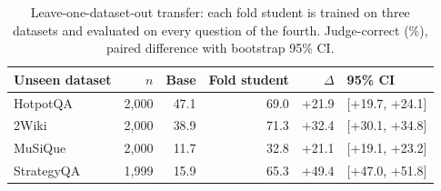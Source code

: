 \begin{table}[t]
\centering
\small
\caption{Leave-one-dataset-out transfer: each fold student is trained on three datasets and evaluated on every question of the fourth. Judge-correct (\%), paired difference with bootstrap 95\% CI.}
\label{tab:E13-lodo}
\begin{tabular}{lrrrrl}
\toprule
Unseen dataset & $n$ & Base & Fold student & $\Delta$ & 95\% CI \\
\midrule
HotpotQA & 2,000 & 47.1 & 69.0 & +21.9 & [+19.7, +24.1] \\
2Wiki & 2,000 & 38.9 & 71.3 & +32.4 & [+30.1, +34.8] \\
MuSiQue & 2,000 & 11.7 & 32.8 & +21.1 & [+19.1, +23.2] \\
StrategyQA & 1,999 & 15.9 & 65.3 & +49.4 & [+47.0, +51.8] \\
\bottomrule
\end{tabular}
\end{table}
